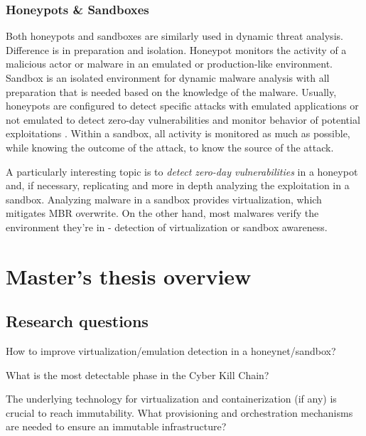 \documentclass[12pt,a4paper,twoside]{report}
\begin{document}
\subsection{Honeypots \& Sandboxes}\label{honeypots-sandboxes}

Both honeypots and sandboxes are similarly used in dynamic threat analysis. Difference is in preparation and isolation. Honeypot monitors the activity of a malicious actor or malware in an emulated or production-like environment. Sandbox is an isolated environment for dynamic malware analysis with all preparation that is needed based on the knowledge of the malware. Usually, honeypots are configured to detect specific attacks with emulated applications or not emulated to detect zero-day vulnerabilities and monitor behavior of potential exploitations \cite{research:enisa:honeypots}. Within a sandbox, all activity is monitored as much as possible, while knowing the outcome of the attack, to know the source of the attack.


A particularly interesting topic is to \emph{detect zero-day vulnerabilities} in a honeypot and, if necessary, replicating and more in depth analyzing the exploitation in a sandbox. Analyzing malware in a sandbox provides virtualization, which mitigates MBR overwrite. On the other hand, most malwares verify the environment they're in - detection of virtualization or sandbox awareness.

\chapter{Master's thesis overview}\label{masters-thesis-overview}

\section{Research questions}\label{research-questions}

How to improve virtualization/emulation detection in a honeynet/sandbox?

What is the most detectable phase in the Cyber Kill Chain?

The underlying technology for virtualization and containerization (if any) is crucial to reach immutability. What provisioning and orchestration mechanisms are needed to ensure an immutable infrastructure?
\end{document}
